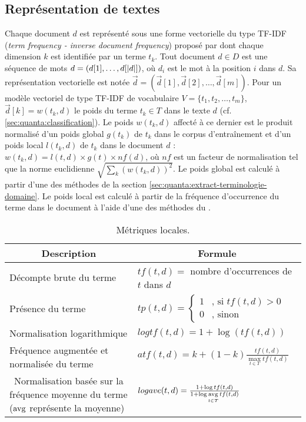 \subsection{Représentation de textes}
Chaque document $d$ est représenté sous une forme vectorielle du type TF-IDF (\textit{term frequency - inverse document frequency}) proposé par \cite{salton1988term-weighting} dont chaque dimension $k$ est identifiée par un terme $t_k$. Tout document $d \in D$ est une séquence de mots $d=(d[1], \dots, d[{\vert d\vert}])$, où $d_i$ est le mot à la position $i$ dans $d$. Sa représentation vectorielle est notée $\vec{d}=(\vec{d}[1], \vec{d}[2], \dots, \vec{d}[m])$. Pour un modèle vectoriel de type TF-IDF de vocabulaire $V = \lbrace t_1, t_2, \dots, t_m \rbrace$, $\vec{d}[k] = w(t_k,d)$ le poids du terme $t_k \in T$ dans le texte $d$ ({cf. \ref{sec:quanta:classification}}). Le poids $w(t_k, d)$ affecté à ce dernier est le produit normalisé d'un poids global $g(t_k)$ de $t_k$ dans le corpus d'entraînement et d'un poids local $l(t_k,d)$ de $t_k$ dans le document $d$ : $w(t_k, d) = l(t,d) \times g(t) \times nf(d)$, où $nf$ est un facteur de normalisation tel que la norme euclidienne $\sqrt{\sum\limits_k (w(t_k,d))^2}$. Le poids global est calculé à partir d'une des méthodes de la section \ref{sec:quanta:extract-terminologie-domaine}. Le poids local est calculé à partir de la fréquence d'occurrence du terme dans le document à l'aide d'une des méthodes du .

\begin{table}[!htb]
	\small\centering
	\begin{tabular}{p{}@{\hskip 0.2in}|p{}}
		\hline
		\multicolumn{1}{c|}{Description} & \multicolumn{1}{c}{Formule} \\
		\hline
		Décompte brute du terme \citep{salton1988term-weighting} & $tf(t,d) = $ nombre d'occurrences de $t$ dans $d$\\ \hline\noalign{\smallskip}
		Présence du terme \citep{salton1988term-weighting} & $tp(t,d) = \left\lbrace \begin{array}{cl}
		1 & \text{, si } tf(t,d) > 0 \\
		0 & \text{, sinon}
		\end{array} \right.$ \\ \hline
		Normalisation logarithmique & $logtf(t,d) = 1 + \log{\left(tf(t,d)\right)}$ \\ \hline
		Fréquence augmentée et normalisée du terme \citep{salton1988term-weighting}%
		& $atf(t,d) = k + (1-k) \frac{tf(t,d)}{\max\limits_{t \in T} tf(t,d)}$ \\ \hline\
		Normalisation basée sur la fréquence moyenne du terme \citep{manning2009irbook-weighting} ($\mathop{\mathrm{avg}}\limits $ représente la moyenne) & $logave(t,d) = \frac{1+\log {tf(t,d)}}{1 + \log \mathop{\mathrm{avg}}\limits\limits_{t \in T} tf(t, d) }$ \\ 
		\hline
	\end{tabular}
	
	\caption{Métriques locales.} \label{tab:sensresultat:metriq_locales}
\end{table}


